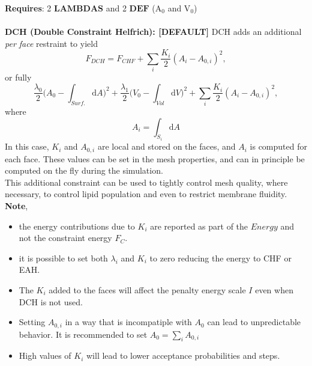 \documentclass[11pt]{article}
\begin{document}
\noindent
\textbf{Requires}: 2 $\textbf{LAMBDAS}$ and 2 $\textbf{DEF}$ (A$_0$ and V$_0$) \\
\noindent \\
\vspace{0.2 cm}
\textbf{DCH (Double Constraint Helfrich): [DEFAULT]}
DCH adds an additional \textit{per face} restraint to yield 
\begin{equation}    
 F_{DCH} = F_{CHF} + \sum_i \frac{K_i}{2}(A_i-A_{0,i})^2 
 , 
 \end{equation}
 or fully 
 \begin{equation}
      \frac{\lambda_0}{2} \bigg(A_0- \int_{Surf.} \mathrm{d}A\bigg)^2  +  \frac{\lambda_1}{2} \bigg(V_0-\int_{Vol} \mathrm{d}V\bigg)^2 
+ \sum_i \frac{K_i}{2}(A_i-A_{0,i})^2 
  ,
  \end{equation}
where 
\begin{equation}
A_i = \int_{S_i} \mathrm{d}A 
\end{equation}
In this case, $K_i$ and $A_{0,i}$ are local and stored on the faces, and $A_i$ is computed for each face. These values can be set in the mesh properties, and can in principle be computed on the fly during the simulation. \\
This additional constraint can be used to tightly control mesh quality, where necessary, to control lipid population and even to restrict membrane fluidity. \textbf{Note},
\begin{itemize}
    \item the energy contributions due to $K_i$ are reported as part of the $Energy$ and not the constraint energy $F_C$.
    \item it is possible to set both $\lambda_i$ and $K_i$ to zero reducing the energy to CHF or EAH. 
\end{itemize}
\begin{tcolorbox}[colback=red!5!white,colframe=red!75!black,title=Warning]
\begin{itemize}
    \item The $K_i$ added to the faces will affect the penalty energy scale $I$ even when DCH is not used. 
    \item Setting $A_{0,i}$ in a way that is incompatiple with $A_0$ can lead to unpredictable behavior. It is recommended to set $A_0 = \sum_i A_{0,i}$
    \item High values of $K_i$ will lead to lower acceptance probabilities and steps.
    \end{itemize}
\end{tcolorbox}
\end{document}
